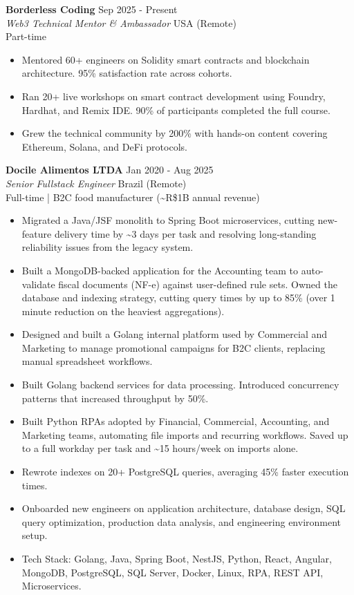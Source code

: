 \documentclass[10pt,a4paper]{article}
\newcommand{\rolehead}[4]{%
    \needspace{4\baselineskip}%
    \textbf{#1} \hfill #2\\
    \textit{#3} \hfill #4\\
}
\begin{document}
\rolehead{Borderless Coding}{Sep 2025 - Present}{Web3 Technical Mentor \& Ambassador}{USA (Remote)}
{\footnotesize Part-time}
\nopagebreak
\begin{itemize}
    \item {\footnotesize Mentored 60+ engineers on Solidity smart contracts and blockchain architecture. 95\% satisfaction rate across cohorts.}
    \item {\footnotesize Ran 20+ live workshops on smart contract development using Foundry, Hardhat, and Remix IDE. 90\% of participants completed the full course.}
    \item {\footnotesize Grew the technical community by 200\% with hands-on content covering Ethereum, Solana, and DeFi protocols.}
\end{itemize}

\rolehead{Docile Alimentos LTDA}{Jan 2020 - Aug 2025}{Senior Fullstack Engineer}{Brazil (Remote)}
{\footnotesize Full-time | B2C food manufacturer (\textasciitilde R\$1B annual revenue)}
\nopagebreak
\begin{itemize}
    \item {\footnotesize Migrated a Java/JSF monolith to Spring Boot microservices, cutting new-feature delivery time by \textasciitilde3 days per task and resolving long-standing reliability issues from the legacy system.}
    \item {\footnotesize Built a MongoDB-backed application for the Accounting team to auto-validate fiscal documents (NF-e) against user-defined rule sets. Owned the database and indexing strategy, cutting query times by up to 85\% (over 1 minute reduction on the heaviest aggregations).}
    \item {\footnotesize Designed and built a Golang internal platform used by Commercial and Marketing to manage promotional campaigns for B2C clients, replacing manual spreadsheet workflows.}
    \item {\footnotesize Built Golang backend services for data processing. Introduced concurrency patterns that increased throughput by 50\%.}
    \item {\footnotesize Built Python RPAs adopted by Financial, Commercial, Accounting, and Marketing teams, automating file imports and recurring workflows. Saved up to a full workday per task and \textasciitilde15 hours/week on imports alone.}
    \item {\footnotesize Rewrote indexes on 20+ PostgreSQL queries, averaging 45\% faster execution times.}
    \item {\footnotesize Onboarded new engineers on application architecture, database design, SQL query optimization, production data analysis, and engineering environment setup.}
    \item {\footnotesize Tech Stack: Golang, Java, Spring Boot, NestJS, Python, React, Angular, MongoDB, PostgreSQL, SQL Server, Docker, Linux, RPA, REST API, Microservices.}
\end{itemize}
\end{document}
